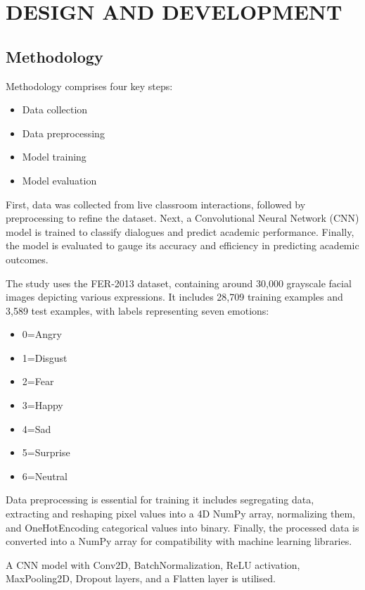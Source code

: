 \chapter[DESIGN AND DEVELOPMENT]{\fontsize{16}{12}\vspace{-.59in}\selectfont DESIGN AND DEVELOPMENT}

\section{Methodology}
Methodology comprises four key steps:
\begin{itemize}
    \item Data collection
    \item Data preprocessing
    \item Model training
    \item Model evaluation
\end{itemize}
\par First, data was collected from live classroom interactions, followed by preprocessing to refine the dataset. Next, a Convolutional Neural Network (CNN) model is trained to classify dialogues and predict academic performance. Finally, the model is evaluated to gauge its accuracy and efficiency in predicting academic outcomes.

The study uses the FER-2013 dataset, containing around 30,000 grayscale facial images depicting various expressions. It includes 28,709 training examples and 3,589 test examples, with labels representing seven emotions: 
\begin{itemize}
    \item 0=Angry
    \item 1=Disgust
    \item 2=Fear
    \item 3=Happy
    \item 4=Sad
    \item 5=Surprise
    \item 6=Neutral
\end{itemize}


\par Data preprocessing is essential for training it includes segregating data, extracting and reshaping pixel values into a 4D NumPy array, normalizing them, and OneHotEncoding categorical values into binary. Finally, the processed data is converted into a NumPy array for compatibility with machine learning libraries.

\par A CNN model with Conv2D, BatchNormalization, ReLU activation, MaxPooling2D, Dropout layers, and a Flatten layer is utilised.

